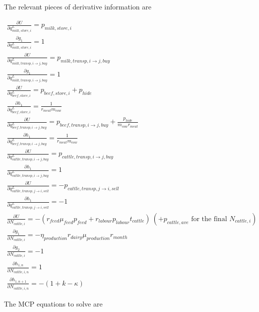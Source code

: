 \documentclass[letter,12pt]{article}
\begin{document}
The relevant pieces of derivative information are

\begin{gather}
\frac{\partial U}{\partial q_{milk,store,i}^L} = p_{milk,store,i} \\
\frac{\partial g_1}{\partial q_{milk,store,i}^L} = 1 \\
\frac{\partial U}{\partial q_{milk,transp,i \rightarrow j,buy}^L} = p_{milk,transp,i \rightarrow j,buy} \\
\frac{\partial g_1}{\partial q_{milk,transp,i \rightarrow j,buy}^L} = 1 \\
\frac{\partial U}{\partial q_{beef,store,i}^L} = p_{beef,store,i} + p_{hide} \\
\frac{\partial h_1}{\partial q_{beef,store,i}^L} = \frac{1}{r_{meat} m_{cow}} \\
\frac{\partial U}{\partial q_{beef,transp,i \rightarrow j,buy}^L} = p_{beef,transp,i \rightarrow j,buy} + \frac{p_{hide}}{m_{cow} r_{meat}} \\
\frac{\partial h_1}{\partial q_{beef,transp,i \rightarrow j,buy}^L} = \frac{1}{r_{meat} m_{cow}} \\
\frac{\partial U}{\partial q_{cattle,transp,i \rightarrow j,buy}^L} = p_{cattle,transp,i \rightarrow j,buy} \\
\frac{\partial h_1}{\partial q_{cattle,transp,i \rightarrow j,buy}^L} = 1 \\
\frac{\partial U}{\partial q_{cattle,transp,j \rightarrow i,sell}^L} = - p_{cattle,transp,j \rightarrow i,sell} \\
\frac{\partial h_1}{\partial q_{cattle,transp,j \rightarrow i,sell}^L} = -1 \\
\frac{\partial U}{\partial N_{cattle,i}} = - \left(r_{feed} \mu_{feed} p_{feed} + r_{labour} p_{labour} t_{cattle}\right) \ \left(+ p_{cattle,ave} \text{ for the final } N_{cattle,i}\right) \\ 
\frac{\partial g_1}{\partial N_{cattle,i}} = - \eta_{production} r_{dairy} \mu_{production} r_{month} \\
\frac{\partial g_2}{\partial N_{cattle,i}} = -1 \\
\frac{\partial h_{1,n}}{\partial N_{cattle,i,n}} = 1 \\
\frac{\partial h_{1,n+1}}{\partial N_{cattle,i,n}} = - \left(1 + k - \kappa \right)
\end{gather}


The MCP equations to solve are
\end{document}
